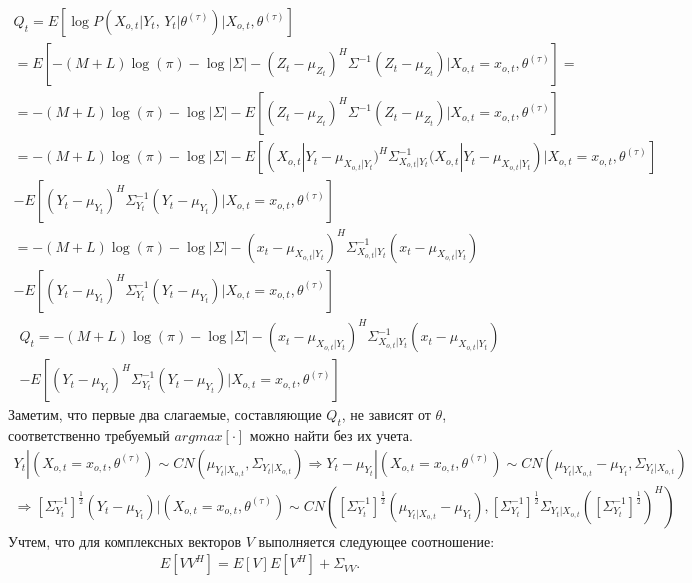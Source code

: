 \documentclass[11pt]{article}
\begin{document}
\begin{gather*}
Q_t = E[\log P(X_{o,t}|Y_t, \, Y_t|\theta^{(\tau)})|X_{o,t}, \theta^{(\tau)}] \\ = E[-(M+L)\log(\pi)-\log|\Sigma|-(Z_t-\mu_{Z_t})^H\Sigma^{-1}(Z_t-\mu_{Z_t})|X_{o,t}=x_{o,t}, \theta^{(\tau)}] = \\
=-(M+L)\log(\pi)-\log|\Sigma| - E[(Z_t-\mu_{Z_t})^H\Sigma^{-1}(Z_t-\mu_{Z_t})|X_{o,t}=x_{o,t}, \theta^{(\tau)}] \\
=-(M+L)\log(\pi)-\log|\Sigma|  -   E[(X_{o,t}|Y_t-\mu_{X_{o,t}|Y_t})^H\Sigma_{X_{o,t}|Y_t}^{-1}(X_{o,t}|Y_t-\mu_{X_{o,t}|Y_t})|X_{o,t}=x_{o,t}, \theta^{(\tau)}] 
\\- E[(Y_t-\mu_{Y_t})^H\Sigma_{Y_t}^{-1}(Y_t-\mu_{Y_t})|X_{o,t}=x_{o,t}, \theta^{(\tau)}] \\
=-(M+L)\log(\pi)-\log|\Sigma| - (x_t-\mu_{X_{o,t}|Y_t})^H\Sigma_{X_{o,t}|Y_t}^{-1}(x_t-\mu_{X_{o,t}|Y_t})\\ - E[(Y_t-\mu_{Y_t})^H\Sigma_{Y_t}^{-1}(Y_t-\mu_{Y_t})|X_{o,t}=x_{o,t},\theta^{(\tau)}] 
\end{gather*}
\begin{equation}
\begin{gathered}
Q_t = -(M+L)\log(\pi)-\log|\Sigma| - (x_t-\mu_{X_{o,t}|Y_t})^H\Sigma_{X_{o,t}|Y_t}^{-1}(x_t-\mu_{X_{o,t}|Y_t}) \\ - E[(Y_t-\mu_{Y_t})^H\Sigma_{Y_t}^{-1}(Y_t-\mu_{Y_t})|X_{o,t}=x_{o,t},\theta^{(\tau)}] 
\end{gathered}
\end{equation}
Заметим, что первые два слагаемые, составляющие $Q_t$, не зависят от $\theta$, соответственно требуемый $argmax [\cdot]$ можно найти без их учета.
\begin{gather*}
Y_t|(X_{o,t}=x_{o,t}, \theta^{(\tau)}) \sim CN(\mu_{Y_t|X_{o,t}}, \Sigma_{Y_t|X_{o,t}}) \Rightarrow Y_t-\mu_{Y_t}|(X_{o,t}=x_{o,t}, \theta^{(\tau)}) \sim CN(\mu_{Y_t|X_{o,t}}-\mu_{Y_t}, \Sigma_{Y_t|X_{o,t}})
\end{gather*}
\begin{gather*}
\Rightarrow [\Sigma_{Y_t}^{-1}]^{\frac{1}{2}}( Y_t-\mu_{Y_t})|(X_{o,t}=x_{o,t}, \theta^{(\tau)}) \sim CN([\Sigma_{Y_t}^{-1}]^{\frac{1}{2}}(\mu_{Y_t|X_{o,t}}-\mu_{Y_t}),[\Sigma_{Y_t}^{-1}]^{\frac{1}{2}} \Sigma_{Y_t|X_{o,t}}([\Sigma_{Y_t}^{-1}]^{\frac{1}{2}})^H)
\end{gather*}
Учтем, что для комплексных векторов $V$ выполняется следующее соотношение: 
\begin{gather}
E[VV^H]=E[V]E[V^H]+\Sigma_{VV}.
\end{gather}
\end{document}
